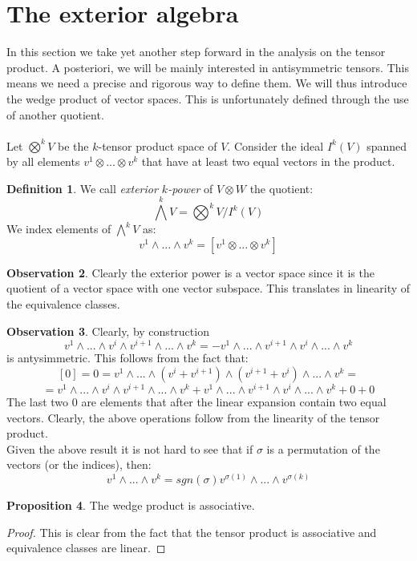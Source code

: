 \documentclass[12pt,a4paper]{report}
\theoremstyle{definition}
\newtheorem{Def}{Definition}[chapter]
\theoremstyle{Theorem}
\newtheorem{Prop}[Def]{Proposition}
\theoremstyle{break}
\theoremstyle{definition}
\newtheorem{Obs}[Def]{Observation}
\begin{document}
	\section{The exterior algebra}
	In this section we take yet another step forward in the analysis on the tensor product. A posteriori, we will be mainly interested in antisymmetric tensors. This means we need a precise and rigorous way to define them. We will thus introduce the wedge product of vector spaces. This is unfortunately defined through the use of another quotient. \\
	\\
	Let $\bigotimes^k V$ be the $k$-tensor product space of $V$. Consider the ideal $I^k(V)$ spanned by all elements $v^1\otimes...\otimes v^k$ that have at least two equal vectors in the product.
	\begin{Def}
		We call \textit{exterior $k$-power} of $V\otimes W$ the quotient:
		$$\bigwedge^k V=\bigotimes^kV/I^k(V)$$	
		We index elements of $\bigwedge^k V$ as:
		$$v^1\wedge...\wedge v^k=[v^1\otimes...\otimes v^k]$$
	\end{Def}
	\begin{Obs}
		Clearly the exterior power is a vector space since it is the quotient of a vector space with one vector subspace. This translates in linearity of the equivalence classes.
	\end{Obs}
	\begin{Obs}
		Clearly, by construction $$v^1\wedge...\wedge v^i\wedge v^{i+1}\wedge...\wedge v^k=-v^1\wedge...\wedge v^{i+1}\wedge v^{i}\wedge...\wedge v^k$$ is antysimmetric. This follows from the fact that:
		$$[0]=0=v^1\wedge...\wedge (v^i+v^{i+1})\wedge (v^{i+1}+v^{i})\wedge...\wedge v^k=$$
		$$=v^1\wedge...\wedge v^i\wedge v^{i+1}\wedge...\wedge v^k+v^1\wedge...\wedge v^{i+1}\wedge v^{i}\wedge...\wedge v^k+0+0$$
		The last two 0 are elements that after the linear expansion contain two equal vectors.
		Clearly, the above operations follow from the linearity of the tensor product.
		\\
		Given the above result it is not hard to see that if $\sigma$ is a permutation of the vectors (or the indices), then:
		$$v^1\wedge...\wedge v^k=sgn(\sigma)v^{\sigma(1)}\wedge...\wedge v^{\sigma(k)}$$
	\end{Obs}
	\begin{Prop}
		The wedge product is associative.
	\end{Prop}
	\begin{proof}
		This is clear from the fact that the tensor product is associative and equivalence classes are linear.
	\end{proof}
\end{document}
